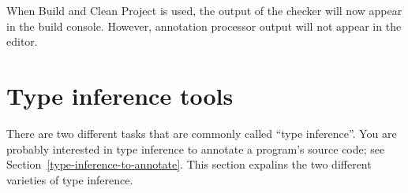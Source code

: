 \begin{enumerate}
When Build and Clean Project is used, the output of the checker will
now appear in the build console. However, annotation processor output
will not appear in the editor.

\end{enumerate}


\section{Type inference tools\label{type-inference-varieties}}

There are two different tasks that are commonly called ``type inference''.
You are probably interested in type inference to annotate a program's
source code; see Section~\ref{type-inference-to-annotate}.  This section
expalins the two different varieties of type inference.

